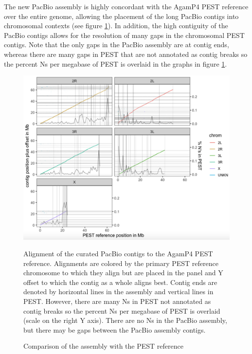 \par{
The new PacBio assembly is highly concordant with the AgamP4 PEST reference over the entire genome, allowing the placement of the long PacBio contigs into chromosomal contexts (see figure \ref{figure:dotplot}). In addition, the high contiguity of the PacBio contigs allows for the resolution of many gaps in the chromosomal PEST contigs. Note that the only gaps in the PacBio assembly are at contig ends, whereas there are many gaps in PEST that are not annotated as contig breaks so the percent Ns per megabase of PEST is overlaid in the graphs in figure \ref{figure:dotplot}. 
}

\begin{figure}[htbp!]

\caption{Comparison of the assembly with the PEST reference}
\label{figure:dotplot}
\begin{centering}
\includegraphics[width=1.0\textwidth]{dotplot.png}
\par{Alignment of the curated PacBio contigs to the AgamP4 PEST reference. Alignments are colored by the primary PEST reference chromosome to which they align but are placed in the panel and Y offset to which the contig as a whole aligns best. Contig ends are denoted by horizontal lines in the assembly and vertical lines in PEST. However, there are many Ns in PEST not annotated as contig breaks so the percent Ns per megabase of PEST is overlaid (scale on the right Y axis). There are no Ns in the PacBio assembly, but there may be gaps between the PacBio assembly contigs.}
\end{centering}
\end{figure}


